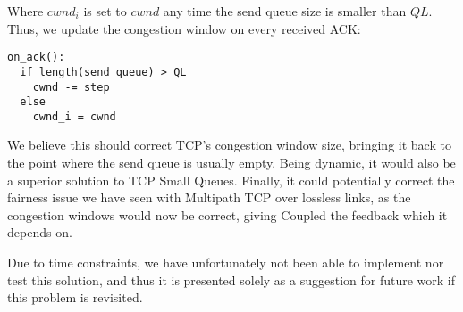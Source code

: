 Where $cwnd_i$ is set to $cwnd$ any time the send queue size is smaller than
$QL$. Thus, we update the congestion window on every received ACK:

\begin{verbatim}
on_ack():
  if length(send queue) > QL
    cwnd -= step
  else
    cwnd_i = cwnd
\end{verbatim}

We believe this should correct TCP's congestion window size, bringing it back to
the point where the send queue is usually empty. Being dynamic, it would also be
a superior solution to TCP Small Queues. Finally, it could potentially correct
the fairness issue we have seen with Multipath TCP over lossless links, as the
congestion windows would now be correct, giving Coupled the feedback which it
depends on.

Due to time constraints, we have unfortunately not been able to implement nor
test this solution, and thus it is presented solely as a suggestion for future
work if this problem is revisited.
